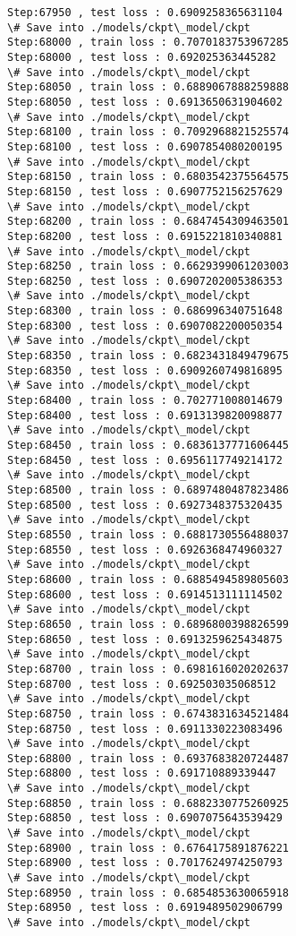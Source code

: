 \documentclass[11pt]{article}
\begin{document}
\begin{Verbatim}[commandchars=\\\{\}]
Step:67950 , test loss : 0.6909258365631104
\# Save into ./models/ckpt\_model/ckpt
Step:68000 , train loss : 0.7070183753967285
Step:68000 , test loss : 0.692025363445282
\# Save into ./models/ckpt\_model/ckpt
Step:68050 , train loss : 0.6889067888259888
Step:68050 , test loss : 0.6913650631904602
\# Save into ./models/ckpt\_model/ckpt
Step:68100 , train loss : 0.7092968821525574
Step:68100 , test loss : 0.6907854080200195
\# Save into ./models/ckpt\_model/ckpt
Step:68150 , train loss : 0.6803542375564575
Step:68150 , test loss : 0.6907752156257629
\# Save into ./models/ckpt\_model/ckpt
Step:68200 , train loss : 0.6847454309463501
Step:68200 , test loss : 0.6915221810340881
\# Save into ./models/ckpt\_model/ckpt
Step:68250 , train loss : 0.6629399061203003
Step:68250 , test loss : 0.6907202005386353
\# Save into ./models/ckpt\_model/ckpt
Step:68300 , train loss : 0.686996340751648
Step:68300 , test loss : 0.6907082200050354
\# Save into ./models/ckpt\_model/ckpt
Step:68350 , train loss : 0.6823431849479675
Step:68350 , test loss : 0.6909260749816895
\# Save into ./models/ckpt\_model/ckpt
Step:68400 , train loss : 0.702771008014679
Step:68400 , test loss : 0.6913139820098877
\# Save into ./models/ckpt\_model/ckpt
Step:68450 , train loss : 0.6836137771606445
Step:68450 , test loss : 0.6956117749214172
\# Save into ./models/ckpt\_model/ckpt
Step:68500 , train loss : 0.6897480487823486
Step:68500 , test loss : 0.6927348375320435
\# Save into ./models/ckpt\_model/ckpt
Step:68550 , train loss : 0.6881730556488037
Step:68550 , test loss : 0.6926368474960327
\# Save into ./models/ckpt\_model/ckpt
Step:68600 , train loss : 0.6885494589805603
Step:68600 , test loss : 0.6914513111114502
\# Save into ./models/ckpt\_model/ckpt
Step:68650 , train loss : 0.6896800398826599
Step:68650 , test loss : 0.6913259625434875
\# Save into ./models/ckpt\_model/ckpt
Step:68700 , train loss : 0.6981616020202637
Step:68700 , test loss : 0.692503035068512
\# Save into ./models/ckpt\_model/ckpt
Step:68750 , train loss : 0.6743831634521484
Step:68750 , test loss : 0.6911330223083496
\# Save into ./models/ckpt\_model/ckpt
Step:68800 , train loss : 0.6937683820724487
Step:68800 , test loss : 0.691710889339447
\# Save into ./models/ckpt\_model/ckpt
Step:68850 , train loss : 0.6882330775260925
Step:68850 , test loss : 0.6907075643539429
\# Save into ./models/ckpt\_model/ckpt
Step:68900 , train loss : 0.6764175891876221
Step:68900 , test loss : 0.7017624974250793
\# Save into ./models/ckpt\_model/ckpt
Step:68950 , train loss : 0.6854853630065918
Step:68950 , test loss : 0.6919489502906799
\# Save into ./models/ckpt\_model/ckpt

\end{Verbatim}
\end{document}
